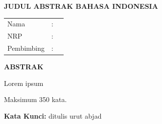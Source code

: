 
\newpage
\thispagestyle{plain}

\begin{center}
    {\fontsize{14}{16}\selectfont\bfseries JUDUL ABSTRAK BAHASA INDONESIA}
\end{center}

\vspace{0.8cm}

\noindent
\begin{tabular}{@{}p{2.5cm}@{}p{0.3cm}@{}p{10cm}@{}}
    Nama & : & \\
    NRP & : & \\
    Pembimbing & : & \\
\end{tabular}

\vspace{1cm}

\begin{center}
    {\fontsize{12}{14}\selectfont\bfseries ABSTRAK}
\end{center}

\vspace{0.5cm}


\noindent
\hspace{1.5cm}Lorem ipsum

Maksimum 350 kata.

\vspace{0.5cm}

\noindent
\textbf{Kata Kunci:} ditulis urut abjad